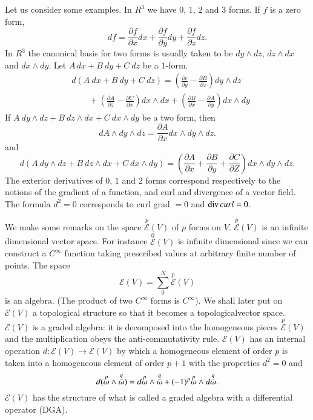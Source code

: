 Let us consider some examples. In $R^{3}$ we have $0$, $1$, $2$ and
$3$ forms. If $f$ is a zero form,
$$
df=\frac{\partial f}{\partial x}dx+\frac{\partial f}{\partial
  y}dy+\frac{\partial f}{\partial z}dz.
$$\pageoriginale
In $R^{3}$ the canonical basis for two forms is usually taken to be
$dy\wedge dz$, $dz\wedge dx$ and $dx\wedge dy$. Let $A\, dx+B
\ dy+C \ dz$ be a $1$-form.
\begin{align*}
& d(A\ dx+B\ dy+C\ dz)=\left(\frac{\partial c}{\partial
    y}-\frac{\partial B}{\partial z}\right)dy\wedge dz\\
&\qquad +\left(\frac{\partial A}{\partial z}-\frac{\partial
    C}{\partial x}\right)dx\wedge dx+\left(\frac{\partial B}{\partial
    x}-\frac{\partial A}{\partial y}\right)dx\wedge dy
\end{align*}
If $A\ dy\wedge dz+B\ dz\wedge dx+C\ dx\wedge dy$ be a two form, then
$$
dA\wedge dy\wedge dz=\frac{\partial A}{\partial x}dx\wedge dy\wedge
dz.
$$
and
$$
d(A\ dy\wedge dz+B\ dz\wedge dx+C\ dx\wedge dy)=\left(\frac{\partial
  A}{\partial x}+\frac{\partial B}{\partial y}+\frac{\partial
  C}{\partial Z}\right)dx\wedge dy\wedge dz.
$$
The exterior derivatives of $0$, $1$ and $2$ forms correspond
respectively to the notions of the gradient of a function, and curl
and divergence of a vector field. The formula $d^{2}=0$ corresponds to
curl grad $=0$ and $\text{div\,} curl =0$.

We make some remarks on the space $\overset{p}{\mathscr{E}}(V)$ of $p$ forms on
$V$. $\overset{p}{\mathscr{E}}(V)$ is an infinite dimensional vector
space. For instance $\overset{0}{\mathscr{E}}(V)$ is infinite
dimensional since we can construct a $C^{\infty}$ function taking
prescribed values at arbitrary finite number of points. The space
$$
\mathscr{E}(V)=\sum^{N}_{0}\overset{p}{\mathscr{E}}(V)
$$
is an algebra. (The product of two $C^{\infty}$ forms is
$C^{\infty}$). We shall later put on $\mathscr{E}(V)$ a topological
structure so that it becomes a topological\pageoriginale vector
space. $\mathscr{E}(V)$ is a graded algebra: it is decomposed into the
homogeneous pieces $\overset{p}{\mathscr{E}}(V)$ and the
multiplication obeys the anti-commutativity
rule. $\mathscr{E}(V)$ has an internal operation
$d:\mathscr{E}(V)\to \mathscr{E}(V)$ by which a homogeneous element of
order $p$ is taken into a homogeneous element of order $p+1$ with the
properties $d^{2}=0$ and
$$
d(\overset{p}{\omega}\wedge
\overset{\underline{q}}{\omega})=d\overset{p}{\omega}\wedge
\overset{\underline{q}}{\omega}+(-1)^{p}\overset{p}{\omega}\wedge
d\overset{\underline{q}}{\omega}.
$$
$\mathscr{E}(V)$ has the structure of what is called a graded algebra
with a differential operator (DGA).

